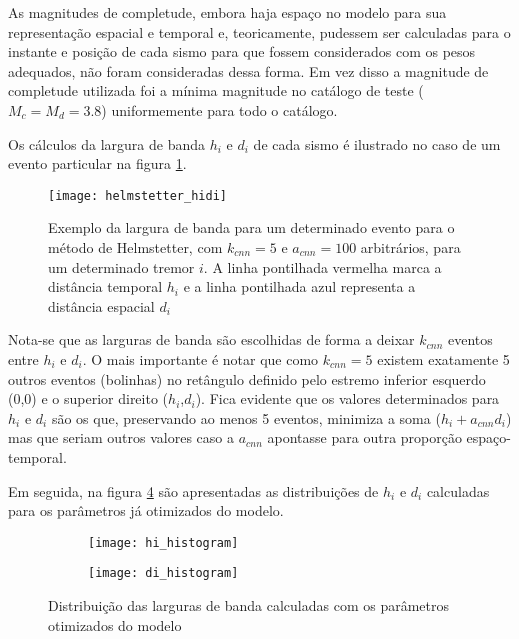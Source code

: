 As magnitudes de completude, embora haja espaço no modelo para sua representação espacial e temporal
e, teoricamente, pudessem ser calculadas para o instante e posição de cada sismo para que fossem
considerados com os pesos adequados, não foram consideradas dessa forma. Em vez disso a magnitude
de completude utilizada foi a mínima magnitude no catálogo de teste ($M_c = M_d = 3.8$) 
uniformemente para todo o catálogo.

Os cálculos da largura de banda $h_i$ e $d_i$ de cada sismo é ilustrado no caso de um evento particular na figura
\ref{fig:h_hidi}.

\begin{figure}[H]
  \centering
  \texttt{[image: helmstetter\_hidi]} 
  \caption{Exemplo da largura de banda para um determinado evento para o método de Helmstetter, com $k_{cnn} = 5$ e
  $a_{cnn} = 100$ arbitrários, para um determinado tremor $i$. A linha pontilhada vermelha marca a distância temporal
  $h_i$ e a linha pontilhada azul representa a distância espacial $d_i$}
  \label{fig:h_hidi} 
\end{figure}

Nota-se que as larguras de banda são escolhidas de forma a deixar $k_{cnn}$ eventos entre $h_i$ e $d_i$.
O mais importante é notar que como $k_{cnn} = 5$ existem exatamente 5 outros eventos (bolinhas) no retângulo
definido pelo estremo inferior esquerdo (0,0) e o superior direito ($h_i$,$d_i$). Fica evidente
que os valores determinados para $h_i$ e $d_i$ são os que, preservando ao menos 5 eventos, minimiza a soma
($h_i + a_{cnn}d_i$) mas que seriam outros valores caso a $a_{cnn}$ apontasse para outra proporção espaço-temporal.

Em seguida, na figura \ref{fig:hidi_hist} são apresentadas as distribuições de $h_i$ e $d_i$ calculadas
para os parâmetros já otimizados do modelo.

\begin{figure}[H]
	\centering
	\begin{subfigure}[b]{0.47\textwidth}
		  	\centering
			\texttt{[image: hi\_histogram]}
			\label{fig:hi_hist}
	\end{subfigure}%
	\quad %
	\begin{subfigure}[b]{0.47\textwidth}
		  	\centering
			\texttt{[image: di\_histogram]}
			\label{fig:di_hist}
    \end{subfigure}%
	\caption{Distribuição das larguras de banda calculadas com os parâmetros otimizados do modelo}
	\label{fig:hidi_hist}
\end{figure}


